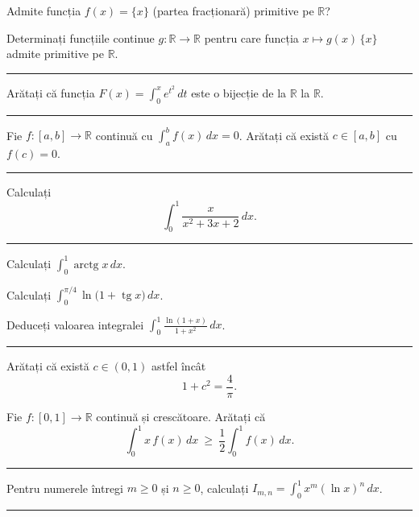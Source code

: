 \begin{parti}
  \item Admite funcția $f(x)=\{x\}$ (partea fracționară) primitive pe $\mathbb{R}$?
  \item Determinați funcțiile continue $g:\mathbb{R}\to\mathbb{R}$ pentru care funcția
        $x\mapsto g(x)\,\{x\}$ admite primitive pe $\mathbb{R}$.
\end{parti}
\vspace{1mm}\hrule

Arătați că funcția $F(x)=\displaystyle\int_0^x e^{t^2}\,dt$ este o bijecție de la $\mathbb{R}$ la $\mathbb{R}$.
\vspace{1mm}\hrule

Fie $f:[a,b]\to\mathbb{R}$ continuă cu $\displaystyle\int_a^bf(x)\,dx=0$. Arătați că există $c\in[a,b]$ cu $f(c)=0$.
\vspace{1mm}\hrule

Calculați
\[ \int_{0}^{1}\frac{x}{x^{2}+3x+2}\,dx . \]
\vspace{1mm}\hrule

\begin{parti}
  \item Calculați $\displaystyle\int_{0}^{1}\operatorname{arctg}x\,dx$.
  \item Calculați $\displaystyle\int_{0}^{\pi/4}\ln\bigl(1+\operatorname{tg}x\bigr)\,dx$.
  \item Deduceți valoarea integralei $\displaystyle\int_{0}^{1}\frac{\ln(1+x)}{1+x^{2}}\,dx$.
\end{parti}
\vspace{1mm}\hrule

\begin{parti}
  \item Arătați că există $c\in(0,1)$ astfel încât
  \[ 1+c^{2}=\frac{4}{\pi} . \]
  \item Fie $f:[0,1]\to\mathbb{R}$ continuă și crescătoare. Arătați că
  \[ \int_{0}^{1}x\,f(x)\,dx\ \ge\ \frac12\int_{0}^{1}f(x)\,dx . \]
\end{parti}
\vspace{1mm}\hrule

Pentru numerele întregi $m \ge 0$ și $n \ge 0$, calculați $\displaystyle I_{m,n} = \int_0^1 x^m (\ln x)^n \, dx$.
\vspace{1mm}\hrule

